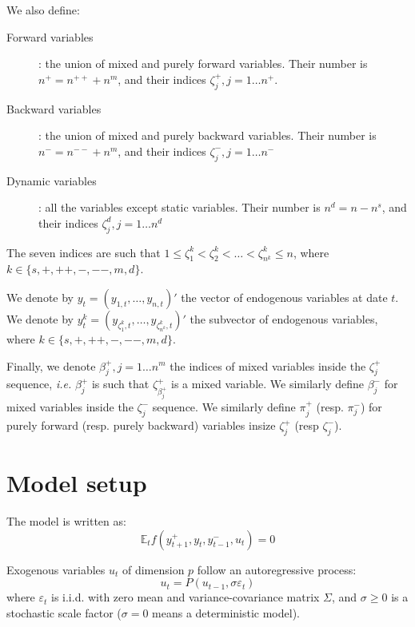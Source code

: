 \documentclass[11pt,a4paper]{article}
\begin{document}
We also define:
\begin{description}
\item[Forward variables]: the union of mixed and purely forward variables. Their number is $n^+ = n^{++} + n^m$, and their indices $\zeta^+_j, j=1\ldots n^+$. 
\item[Backward variables]: the union of mixed and purely backward variables. Their number is $n^- = n^{--} + n^m$, and their indices $\zeta^-_j, j=1\ldots n^-$
\item[Dynamic variables]: all the variables except static variables. Their number is $n^d = n - n^s$, and their indices $\zeta^d_j, j=1\ldots n^d$
\end{description}

The seven indices are such that $1 \leq \zeta^k_1 < \zeta^k_2 < \ldots < \zeta^k_{n^k} \leq n$, where $k \in \{ s, +, ++, -, --, m, d \}$.

We denote by $y_t = (y_{1,t}, \ldots, y_{n,t})'$ the vector of endogenous variables at date $t$. We denote by $y^k_t = (y_{\zeta^k_1, t}, \ldots, y_{\zeta^k_{n^k}, t})'$ the subvector of endogenous variables, where $k \in \{ s, +, ++, -, --, m, d \}$.

Finally, we denote $\beta^+_j, j=1\ldots n^m$ the indices of mixed variables inside the $\zeta^+_j$ sequence, \textit{i.e.} $\beta^+_j$ is such that $\zeta^+_{\beta^+_j}$ is a mixed variable. We similarly define $\beta^-_j$ for mixed variables inside the $\zeta^-_j$ sequence. We similarly define $\pi^+_j$ (resp. $\pi^-_j$) for purely forward (resp. purely backward) variables insize $\zeta^+_j$ (resp $\zeta^-_j$).

\section{Model setup}

The model is written as:
\begin{equation*}
  \mathbb{E}_t f(y^+_{t+1}, y_t, y^-_{t-1}, u_t) = 0
\end{equation*}

Exogenous variables $u_t$ of dimension $p$ follow an autoregressive process:
\begin{equation*}
  u_t = P(u_{t-1}, \sigma \varepsilon_t)
\end{equation*}
where $\varepsilon_t$ is i.i.d. with zero mean and variance-covariance matrix $\Sigma$, and $\sigma \geq 0$ is a stochastic scale factor ($\sigma=0$ means a deterministic model).
\end{document}
